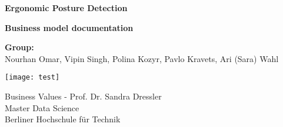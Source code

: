 \begin{titlepage}
    \begin{center}
        \vspace*{1cm}
        
        \Huge
        \textbf{Ergonomic Posture Detection}
        
        \vspace{0.5cm}
        \LARGE
        \textbf{Business model documentation}
        
        \vspace{1.5cm}
        \Large
        \textbf{Group:}\\
        Nourhan Omar, Vipin Singh, Polina Kozyr, Pavlo Kravets, Ari (Sara) Wahl
        
        \vfill
        \texttt{[image: test]}
        \vfill
        
        \Large
        Business Values - Prof. Dr. Sandra Dressler\\
        Master Data Science\\
        Berliner Hochschule für Technik
        
    \end{center}
\end{titlepage}